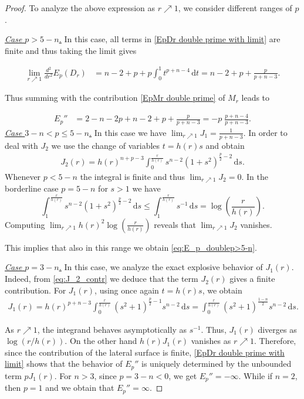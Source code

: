 \documentclass[10pt,leqno]{amsart}
\newcommand{\dd}{\, \mathrm{d}}
\numberwithin{Theorem}{section}
\theoremstyle{definition}
\theoremstyle{remark}
\numberwithin{equation}{section}
\numberwithin{equation}{section}
\begin{document}
\begin{proof}
To analyze the above expression as $r \nearrow 1$, we consider different ranges of $p$.

\textit{\underline{Case $p>5-n$.}} 
In this case, all terms in \eqref{EpDr double prime with limit} are finite and thus taking the limit gives

     \begin{align*}
  \lim_{r\nearrow 1} \frac{d^2}{dr^2}E_p(D_r) &=   n-2 + p+p  \int_0^{1} t^{p+n-4} \dd t=  n-2+p + \frac{p}{p+n-3}.
 \end{align*}

Thus summing with the contribution \eqref{EpMr double prime} of $M_r$ leads to 

\begin{align}\label{eq:E_p_doublep>5-n}
    E_p'' &=   2-n-2p +   n-2+p + \frac{p}{p+n-3} =-p \; \frac{p+n-4}{p+n-3}.
\end{align}
\textit{\underline{Case $3-n<p\leq 5-n$.}}  
In this case we have $\lim_{r\nearrow 1}J_1=\frac{1}{p+n-3}$. In order to deal with $J_2$ we use the change of variables $t=h(r)s$ and obtain
\begin{align}\label{eq:J_2_contr}
    J_2(r)=h(r)^{n+p-3} \int_0^{\frac{r}{h(r)}} s^{n-2} (1+s^2)^{\frac{p}{2}-2} \dd s.
\end{align}
Whenever $p <5-n$ the integral is finite and thus $\lim_{r \nearrow 1} J_2=0$. In the borderline case $p=5-n$ for $s>1$ we have
\[
\int_{1}^{\frac{r}{h(r)}} s^{n-2} (1+s^2)^{\frac{p}{2}-2} \dd s \leq \int_{1}^{\frac{r}{h(r)}} s^{-1} \dd s  = \log \left( \frac{r}{h(r)}\right).
\]
 Computing $\lim_{r \nearrow 1} h(r)^2  \log \left( \frac{r}{h(r)}\right)$ reveals that $\lim_{r \nearrow 1} J_2$ vanishes.
 
 This implies that also in this range we obtain \eqref{eq:E_p_doublep>5-n}.



\smallskip  
\textit{\underline{Case $p=3-n$.}}
In this case, we analyze the exact explosive behavior of $J_1(r)$. Indeed, from \eqref{eq:J_2_contr} we deduce that the term $J_2(r)$ gives a finite contribution. For $J_1(r)$, using once again $t=h(r)s$, we obtain
\begin{align} \label{eq:J_1}
    J_1(r) = h(r)^{p+n-3} \int_0^{\frac{r}{h(r)}} (s^2+1)^{\frac{p}{2}-1} s^{n-2} \dd s = \int_0^{\frac{r}{h(r)}} (s^2+1)^{\frac{1-n}{2}} s^{n-2} \dd s.
\end{align}

As $r\nearrow 1$, the integrand behaves asymptotically as $s^{-1}$. Thus, $J_1(r)$ diverges  as $\log(r/h(r))$.
On the other hand $h(r)J_1(r)$ vanishes as $r \nearrow 1$.
Therefore, since the contribution of the lateral surface is finite, \eqref{EpDr double prime with limit} shows that the behavior of $E_p''$ is uniquely determined by the unbounded term $p J_1(r)$.
For $n>3$, since $p=3-n<0$, we get $E_p''=-\infty$.
While if $n = 2$, then $p = 1$ and we obtain that $E_p'' = \infty$.



\end{proof}
\end{document}
